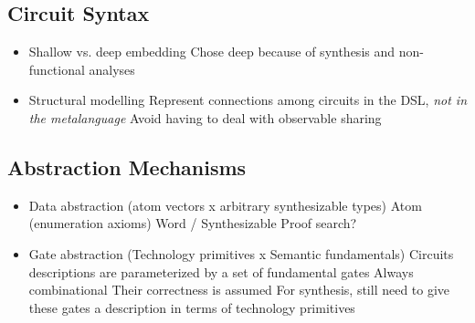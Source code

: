 \documentclass[a4paper]{article}
\begin{document}

        \subsection{Circuit Syntax}
        \label{subsec:circuit-types}
            \begin{itemize}
                \item Shallow vs. deep embedding
                    \subitem Chose deep because of synthesis and non-functional analyses
                \item Structural modelling
                    \subitem Represent connections among circuits in the DSL, \emph{not in the metalanguage}
                    \subitem Avoid having to deal with observable sharing
            \end{itemize}

        \subsection{Abstraction Mechanisms}
        \label{subsec:abstraction}
            \begin{itemize}
                \item Data abstraction (atom vectors x arbitrary synthesizable types)
                    \subitem Atom (enumeration axioms)
                    \subitem Word / Synthesizable
                        \subsubitem Proof search?
                \item Gate abstraction (Technology primitives x Semantic fundamentals)
                    \subitem Circuits descriptions are parameterized by a set of fundamental gates
                        \subsubitem Always combinational
                        \subsubitem Their correctness is assumed
                    \subitem For synthesis, still need to give these gates a description in terms of technology primitives
            \end{itemize}
\end{document}
